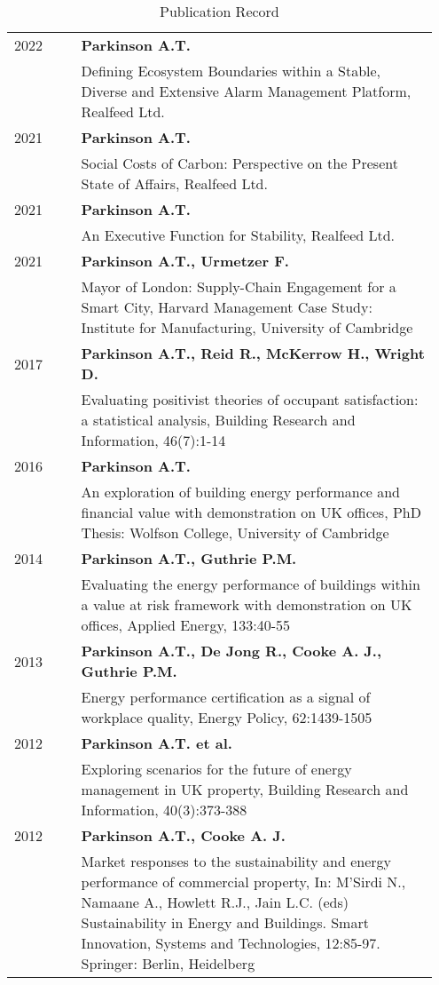 \documentclass[11pt, oneside]{article}   	%
\begin{document}
\pagebreak


\begin{table}[h]
\vspace{-5mm}
\caption*{Publication Record}
\vspace{-5mm}
\small
\begin{center}
\begin{tabular}{p{0.15\linewidth} p{0.8\linewidth}}
\hline
2022&\textbf{Parkinson A.T.}\\
&Defining Ecosystem Boundaries within a Stable, Diverse and Extensive Alarm Management Platform, Realfeed Ltd.\\
2021&\textbf{Parkinson A.T.}\\
&Social Costs of Carbon: Perspective on the Present State of Affairs, Realfeed Ltd.\\
2021&\textbf{Parkinson A.T.}\\
&An Executive Function for Stability, Realfeed Ltd.\\
2021&\textbf{Parkinson A.T., Urmetzer F.}\\
&Mayor of London: Supply-Chain Engagement for a Smart City, Harvard Management Case Study: Institute for Manufacturing, University of Cambridge\\
2017&\textbf{Parkinson A.T., Reid R., McKerrow H., Wright D.}\\
&Evaluating positivist theories of occupant satisfaction: a statistical analysis, Building Research and Information, 46(7):1-14\\
2016&\textbf{Parkinson A.T.}\\
&An exploration of building energy performance and financial value with demonstration on UK offices, PhD Thesis: Wolfson College, University of Cambridge\\
2014&\textbf{Parkinson A.T., Guthrie P.M.}\\
&Evaluating the energy performance of buildings within a value at risk framework with demonstration on UK offices, Applied Energy, 133:40-55\\
2013&\textbf{Parkinson A.T., De Jong R., Cooke A. J., Guthrie P.M.}\\
&Energy performance certification as a signal of workplace quality, Energy Policy, 62:1439-1505\\
2012&\textbf{Parkinson A.T. et al.}\\
&Exploring scenarios for the future of energy management in UK property, Building Research and Information, 40(3):373-388\\
2012&\textbf{Parkinson A.T., Cooke A. J.}\\
&Market responses to the sustainability and energy performance of commercial property, In: M'Sirdi N., Namaane A., Howlett R.J., Jain L.C. (eds) Sustainability in Energy and Buildings. Smart Innovation, Systems and Technologies, 12:85-97. Springer: Berlin, Heidelberg\\
\hline
\end{tabular}
\end{center}
\vspace{-10mm}
\end{table}
\end{document}
